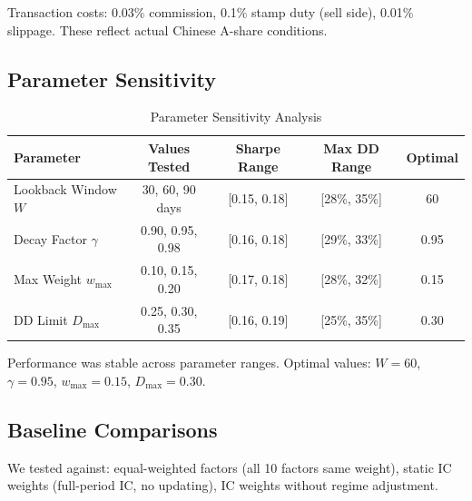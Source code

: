 Transaction costs: 0.03\% commission, 0.1\% stamp duty (sell side), 0.01\% slippage. These reflect actual Chinese A-share conditions.

\subsection{Parameter Sensitivity}

\begin{table}[h]
\centering
\caption{Parameter Sensitivity Analysis}
\label{tab:sensitivity}
\begin{tabular}{lcccc}
\toprule
Parameter & Values Tested & Sharpe Range & Max DD Range & Optimal \\
\midrule
Lookback Window $W$ & 30, 60, 90 days & [0.15, 0.18] & [28\%, 35\%] & 60 \\
Decay Factor $\gamma$ & 0.90, 0.95, 0.98 & [0.16, 0.18] & [29\%, 33\%] & 0.95 \\
Max Weight $w_{\max}$ & 0.10, 0.15, 0.20 & [0.17, 0.18] & [28\%, 32\%] & 0.15 \\
DD Limit $D_{\max}$ & 0.25, 0.30, 0.35 & [0.16, 0.19] & [25\%, 35\%] & 0.30 \\
\bottomrule
\end{tabular}
\end{table}

Performance was stable across parameter ranges. Optimal values: $W=60$, $\gamma=0.95$, $w_{\max}=0.15$, $D_{\max}=0.30$.

\subsection{Baseline Comparisons}

We tested against: equal-weighted factors (all 10 factors same weight), static IC weights (full-period IC, no updating), IC weights without regime adjustment.